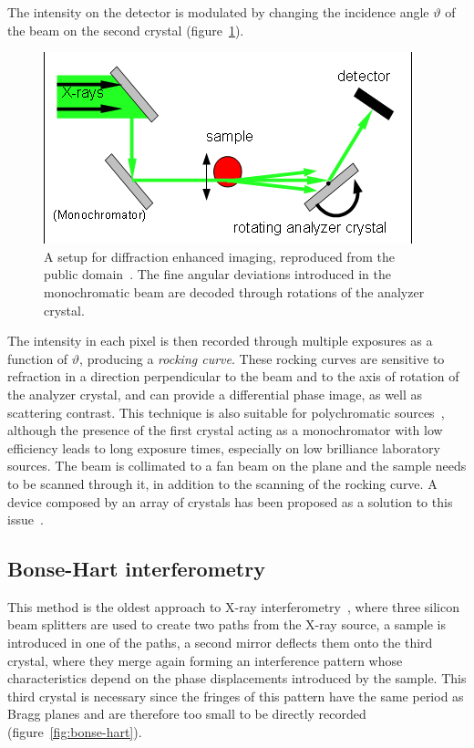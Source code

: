 The intensity on the detector is modulated by changing the incidence angle
$\vartheta$ of the beam on the second crystal (figure~\ref{fig:dei}).
\begin{figure}[htb]
    \centering
    \includegraphics[width=.7\textwidth]{gfx/analyzer-based_imaging.png}
    \caption[Analyzer-based setup.]{A setup for diffraction enhanced
        imaging, reproduced from the public domain~\parencite{analyzer-based-picture}. The fine angular deviations introduced in the
    monochromatic beam are decoded through rotations of the analyzer crystal.}
    \label{fig:dei}
\end{figure}
The intensity in each pixel is then recorded through multiple exposures as a
function of $\vartheta$, producing a \emph{rocking curve}. These rocking
curves are sensitive to refraction in a direction perpendicular to the beam
and to the axis of rotation of the analyzer crystal, and can provide a
differential phase image, as well as scattering contrast. This technique
is also suitable for polychromatic sources~\parencite{doi:10.1117/12.813669,PARHAM2009911}, although the presence of the
first crystal acting as a monochromator with low efficiency leads to
long exposure times, especially on low brilliance laboratory sources. The
beam is collimated to a fan beam on the plane and the sample needs to
be scanned through it, in addition to the scanning of the rocking curve. A
device composed by an array of crystals has been proposed as a solution to
this issue~\parencite{Connor2014}.

\subsection{Bonse-Hart interferometry}
This method is the oldest approach to X-ray
interferometry~\parencite{1965ApPhL...7...99B,1965ApPhL...6..155B}, where three
silicon beam splitters are used to create two paths from the X-ray source, a
sample is introduced in one of the paths, a second mirror deflects them onto
the third crystal, where they merge again forming an interference pattern
whose characteristics depend on the phase displacements introduced by the
sample. This third crystal is necessary since the fringes of this pattern
have the same period as Bragg planes and are therefore too small to be
directly recorded~\parencite{1974ApOpt..13.2693B} (figure~\ref{fig:bonse-hart}).

